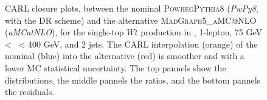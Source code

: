 \begin{figure}[!htbp]
    \centering
      \caption{CARL closure plots, between the nominal \textsc{Powheg}\textsc{Pythia}8 (\textit{PwPy8}, with the DR scheme) and the alternative \textsc{MadGraph5\_aMC@NLO} (\textit{aMCatNLO}), for the single-top $Wt$ production in \vhb, 1-lepton, 75 GeV < \ptv\ < 400 GeV, and 2 jets. The CARL interpolation (orange) of the nominal (blue) into the alternative (red) is smoother and with a lower MC statistical uncertainty. The top pannels show the distributions, the middle pannels the ratios, and the bottom pannels the residuals.}
      \label{fig:carl:resolved_closure_stopWt}
  \end{figure}
  

